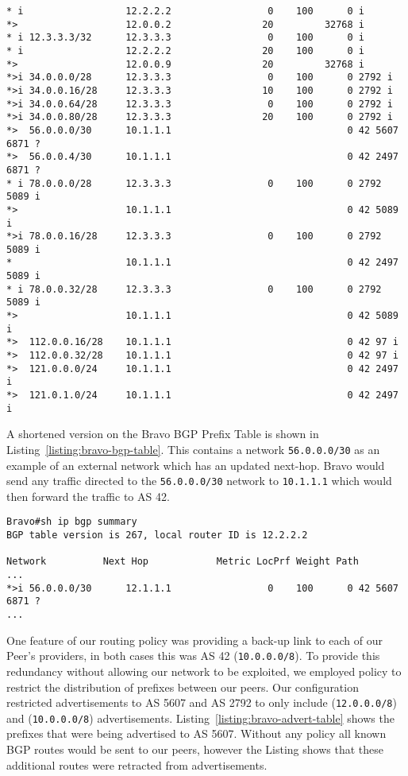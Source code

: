 \begin{lstlisting}[caption={Extract of Alpha BGP Table}, label={listing:bgp-table}]
* i                  12.2.2.2                 0    100      0 i
*>                   12.0.0.2                20         32768 i
* i 12.3.3.3/32      12.3.3.3                 0    100      0 i
* i                  12.2.2.2                20    100      0 i
*>                   12.0.0.9                20         32768 i
*>i 34.0.0.0/28      12.3.3.3                 0    100      0 2792 i
*>i 34.0.0.16/28     12.3.3.3                10    100      0 2792 i
*>i 34.0.0.64/28     12.3.3.3                 0    100      0 2792 i
*>i 34.0.0.80/28     12.3.3.3                20    100      0 2792 i
*>  56.0.0.0/30      10.1.1.1                               0 42 5607 6871 ?
*>  56.0.0.4/30      10.1.1.1                               0 42 2497 6871 ?
* i 78.0.0.0/28      12.3.3.3                 0    100      0 2792 5089 i
*>                   10.1.1.1                               0 42 5089 i
*>i 78.0.0.16/28     12.3.3.3                 0    100      0 2792 5089 i
*                    10.1.1.1                               0 42 2497 5089 i
* i 78.0.0.32/28     12.3.3.3                 0    100      0 2792 5089 i
*>                   10.1.1.1                               0 42 5089 i
*>  112.0.0.16/28    10.1.1.1                               0 42 97 i
*>  112.0.0.32/28    10.1.1.1                               0 42 97 i
*>  121.0.0.0/24     10.1.1.1                               0 42 2497 i
*>  121.0.1.0/24     10.1.1.1                               0 42 2497 i
\end{lstlisting}

A shortened version on the Bravo BGP Prefix Table is shown in
Listing~\ref{listing:bravo-bgp-table}. This contains a network
\texttt{56.0.0.0/30} as an example of an external network which has an updated
next-hop. Bravo would send any traffic directed to the \texttt{56.0.0.0/30}
network to \texttt{10.1.1.1} which would then forward the traffic to AS 42.

\begin{lstlisting}[caption={Extract of Bravo BGP Table}, label={listing:bravo-bgp-table}]
Bravo#sh ip bgp summary
BGP table version is 267, local router ID is 12.2.2.2

Network          Next Hop            Metric LocPrf Weight Path
...
*>i 56.0.0.0/30      12.1.1.1                 0    100      0 42 5607 6871 ?
...
\end{lstlisting}

One feature of our routing policy was providing a back-up link to each of our
Peer's providers, in both cases this was AS 42 (\texttt{10.0.0.0/8}). To
provide this redundancy without allowing our network to be exploited, we
employed policy to restrict the distribution of prefixes between our peers. Our
configuration restricted advertisements to AS 5607 and AS 2792 to only include
(\texttt{12.0.0.0/8}) and (\texttt{10.0.0.0/8}) advertisements.
Listing~\ref{listing:bravo-advert-table} shows the prefixes that were being
advertised to AS 5607. Without any policy all known BGP routes would be sent to
our peers, however the Listing shows that these additional routes were
retracted from advertisements.

